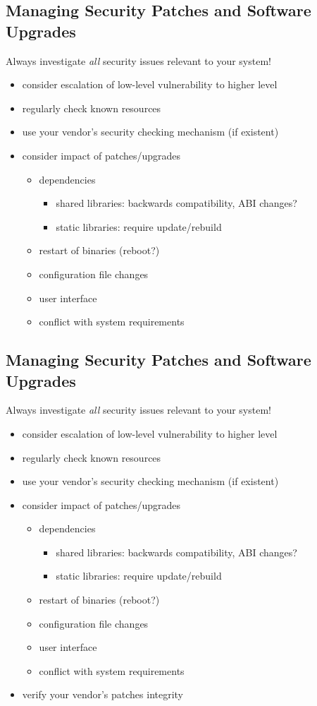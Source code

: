 \documentclass[xga]{xdvislides}
\begin{document}
\subsection{Managing Security Patches and Software Upgrades}
Always investigate {\em all} security issues relevant to your system!
\begin{itemize}
	\item consider escalation of low-level vulnerability to higher level
	\item regularly check known resources
	\item use your vendor's security checking mechanism (if existent)
	\item consider impact of patches/upgrades
		\begin{itemize}
			\item dependencies
				\begin{itemize}
					\item shared libraries:  backwards compatibility, ABI
						changes?
					\item static libraries:  require update/rebuild
				\end{itemize}
			\item restart of binaries (reboot?)
			\item configuration file changes
			\item user interface
			\item conflict with system requirements
		\end{itemize}
\end{itemize}

\subsection{Managing Security Patches and Software Upgrades}
Always investigate {\em all} security issues relevant to your system!
\begin{itemize}
	\item consider escalation of low-level vulnerability to higher level
	\item regularly check known resources
	\item use your vendor's security checking mechanism (if existent)
	\item consider impact of patches/upgrades
		\begin{itemize}
			\item dependencies
				\begin{itemize}
					\item shared libraries:  backwards compatibility, ABI
						changes?
					\item static libraries:  require update/rebuild
				\end{itemize}
			\item restart of binaries (reboot?)
			\item configuration file changes
			\item user interface
			\item conflict with system requirements
		\end{itemize}
	\item verify your vendor's patches integrity
\end{itemize}
\end{document}
